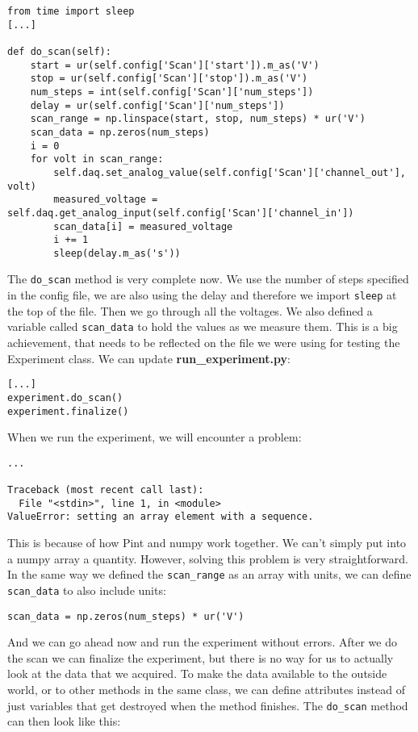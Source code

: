 {{{{\begin{verbatim}
from time import sleep
[...]

def do_scan(self):
    start = ur(self.config['Scan']['start']).m_as('V')
    stop = ur(self.config['Scan']['stop']).m_as('V')
    num_steps = int(self.config['Scan']['num_steps'])
    delay = ur(self.config['Scan']['num_steps'])
    scan_range = np.linspace(start, stop, num_steps) * ur('V')
    scan_data = np.zeros(num_steps)
    i = 0
    for volt in scan_range:
        self.daq.set_analog_value(self.config['Scan']['channel_out'], volt)
        measured_voltage = self.daq.get_analog_input(self.config['Scan']['channel_in'])
        scan_data[i] = measured_voltage
        i += 1
        sleep(delay.m_as('s'))
\end{verbatim}

The \texttt{do\_scan} method is very complete now. We use the number of steps specified in the config file, we are also using the delay and therefore we import \texttt{sleep} at the top of the file. Then we go through all the voltages. We also defined a variable called \texttt{scan\_data} to hold the values as we measure them. This is a big achievement, that needs to be reflected on the file we were using for testing the Experiment class. We can update \textbf{run\_experiment.py}:

\begin{verbatim}
[...]
experiment.do_scan()
experiment.finalize()
\end{verbatim}

When we run the experiment, we will encounter a problem:

\begin{verbatim}
...

Traceback (most recent call last):
  File "<stdin>", line 1, in <module>
ValueError: setting an array element with a sequence.
\end{verbatim}

This is because of how Pint and numpy work together. We can't simply put into a numpy array a quantity. However, solving this problem is very straightforward. In the same way we defined the \texttt{scan\_range} as an array with units, we can define \texttt{scan\_data} to also include units:

\begin{verbatim}
scan_data = np.zeros(num_steps) * ur('V')
\end{verbatim}

And we can go ahead now and run the experiment without errors. After we do the scan we can finalize the experiment, but there is no way for us to actually look at the data that we acquired. To make the data available to the outside world, or to other methods in the same class, we can define attributes instead of just variables that get destroyed when the method finishes. The \texttt{do\_scan} method can then look like this:

}}}}
